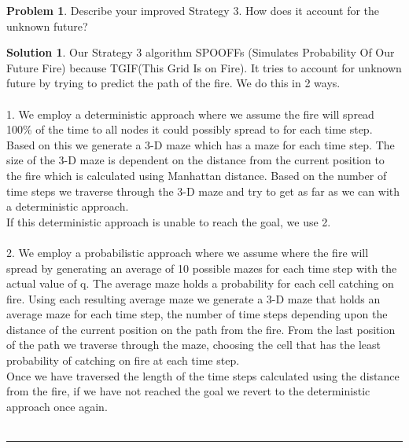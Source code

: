 \documentclass{article}
\theoremstyle{definition}
\newtheorem{problem}{Problem}
\def\fline{\rule{0.75\linewidth}{0.5pt}}
\newcommand{\finishline}{\vspace{-15pt}\begin{center}\fline\end{center}}
\newtheorem*{solution*}{Solution}
\newenvironment{solution}{\begin{solution*}}{{\finishline} \end{solution*}}
\begin{document}
\smallskip

\begin{problem}
	Describe your improved Strategy 3. How does it account for the unknown future?
\end{problem}

\smallskip

\begin{solution}

	Our Strategy 3 algorithm SPOOFFs (Simulates Probability Of Our Future Fire) because TGIF(This Grid Is on Fire). It tries to account for unknown future by trying to predict the path of the fire. We do this in 2 ways. 
    \\\\
	1. We employ a deterministic approach where we assume the fire will spread 100\% of the time to all nodes it could possibly spread to for each time step. Based on this we generate a 3-D maze which has a maze for each time step. The size of the 3-D maze is dependent on the distance from the current position to the fire which is calculated using Manhattan distance. Based on the number of time steps we traverse through the 3-D maze and try to get as far as we can with a deterministic approach. 
	\\
	If this deterministic approach is unable to reach the goal, we use 2. 
	\\\\
	2. We employ a probabilistic approach where we assume where the fire will spread by generating an average of 10 possible mazes for each time step with the actual value of q. The average maze holds a probability for each cell catching on fire. Using each resulting average maze we generate a 3-D maze that holds an average maze for each time step, the number of time steps depending upon the distance of the current position on the path from the fire. From the last position of the path we traverse through the maze, choosing the cell that has the least probability of catching on fire at each time step.
	\\ 
	Once we have traversed the length of the time steps calculated using the distance from the fire, if we have not reached the goal we revert to the deterministic approach once again.
	\\\\

\end{solution}
\end{document}
